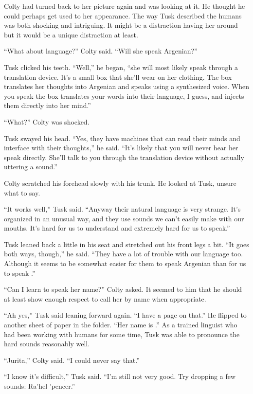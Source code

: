 Colty had turned back to her picture again and was looking at it. He thought he could perhaps
get used to her appearance. The way Tusk described the humans was both shocking and intriguing.
It might be a distraction having her around but it would be a unique distraction at least.

``What about language?'' Colty said. ``Will she speak Argenian?''

Tusk clicked his teeth. ``Well,'' he began, ``she will most likely speak through a translation
device. It's a small box that she'll wear on her clothing. The box translates her thoughts into
Argenian and speaks using a synthesized voice. When you speak the box translates your words into
their language, I guess, and injects them directly into her mind.''

``What?'' Colty was shocked.

Tusk swayed his head. ``Yes, they have machines that can read their minds and interface with
their thoughts,'' he said. ``It's likely that you will never hear her speak directly. She'll
talk to you through the translation device without actually uttering a sound.''

Colty scratched his forehead slowly with his trunk. He looked at Tusk, unsure what to say.

``It works well,'' Tusk said. ``Anyway their natural language is very strange. It's organized in
an unusual way, and they use sounds we can't easily make with our mouths. It's hard for us to
understand and extremely hard for us to speak.''

Tusk leaned back a little in his seat and stretched out his front legs a bit. ``It goes both
ways, though,'' he said. ``They have a lot of trouble with our language too. Although it seems
to be somewhat easier for them to speak Argenian than for us to speak .''

``Can I learn to speak her name?'' Colty asked. It seemed to him that he should at least show
enough respect to call her by name when appropriate.

``Ah yes,'' Tusk said leaning forward again. ``I have a page on that.'' He flipped to another
sheet of paper in the folder. ``Her name is .'' As a trained linguist who
had been working with humans for some time, Tusk was able to pronounce the hard sounds reasonably
well.

``Jurita,'' Colty said. ``I could never say that.''

``I know it's difficult,'' Tusk said. ``I'm still not very good. Try dropping a few sounds:
Ra'hel 'pencer.''

